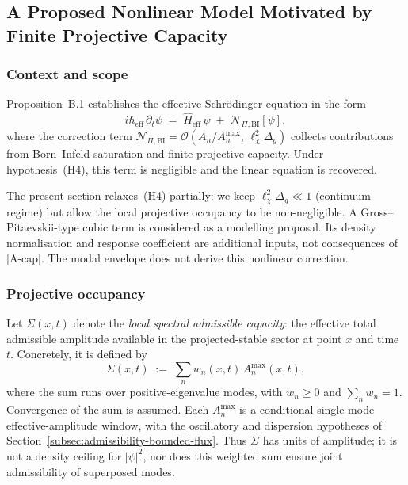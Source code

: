 \subsection{A Proposed Nonlinear Model Motivated by Finite Projective Capacity}
  \label{subsec:nonlinear-projective-correction}

  \subsubsection*{Context and scope}

    Proposition~B.1 establishes the effective Schr\"{o}dinger equation in the form
    \begin{equation}
      \label{eq:schro-full}
      i\hbar_{\mathrm{eff}}\,\partial_t\psi
      \;=\;
      \hat{H}_{\mathrm{eff}}\,\psi \;+\; \mathcal{N}_{\Pi,\mathrm{BI}}[\psi],
    \end{equation}
    where the correction term $\mathcal{N}_{\Pi,\mathrm{BI}} = \mathcal{O}(A_n/A_n^{\max},\,\ell_\chi^2\Delta_g)$
    collects contributions from Born--Infeld saturation and finite projective capacity.
    Under hypothesis~(H4), this term is negligible and the linear equation is recovered.

    The present section relaxes~(H4) partially: we keep $\ell_\chi^2\Delta_g\ll 1$ (continuum
    regime) but allow the local projective occupancy to be non-negligible.
    A Gross--Pitaevskii-type cubic term is considered as a modelling proposal.
    Its density normalisation and response coefficient are additional inputs, not consequences of [A-cap].
    The modal envelope does not derive this nonlinear correction.

  \subsubsection*{Projective occupancy}

    Let $\Sigma(x,t)$ denote the \emph{local spectral admissible capacity}: the effective
    total admissible amplitude available in the projected-stable sector at point $x$ and
    time~$t$.
    Concretely, it is defined by
    \begin{equation}
      \label{eq:Sigma-def}
      \Sigma(x,t) \;:=\; \sum_n w_n(x,t)\,A_n^{\max}(x,t),
    \end{equation}
    where the sum runs over positive-eigenvalue modes, with $w_n\geq0$ and $\sum_nw_n=1$.
    Convergence of the sum is assumed.
    Each $A_n^{\max}$ is a conditional single-mode effective-amplitude window, with the oscillatory
    and dispersion hypotheses of Section~\ref{subsec:admissibility-bounded-flux}.
    Thus $\Sigma$ has units of amplitude; it is not a density ceiling for $|\psi|^2$, nor does this
    weighted sum ensure joint admissibility of superposed modes.

